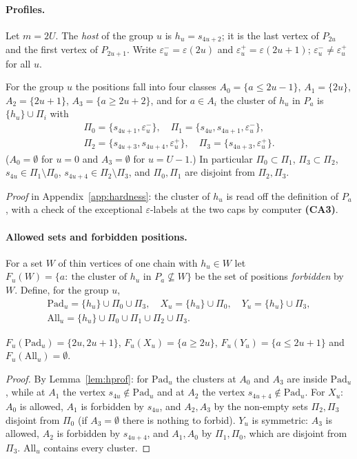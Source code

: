 \paragraph{Profiles.} Let $m=2U$. The \emph{host} of the group $u$ is $h_u=s_{4u+2}$; it is the last vertex of $P_{2u}$ and the first vertex of $P_{2u+1}$. Write $\varepsilon^-_u=\varepsilon(2u)$ and $\varepsilon^+_u=\varepsilon(2u+1)$; $\varepsilon^-_u\ne\varepsilon^+_u$ for all $u$.
\begin{lemma}\label{lem:hprof}
For the group $u$ the positions fall into four classes $A_0=\{a\le2u-1\}$, $A_1=\{2u\}$, $A_2=\{2u+1\}$, $A_3=\{a\ge 2u+2\}$, and for $a\in A_i$ the cluster of $h_u$ in $P_a$ is $\{h_u\}\cup\Pi_i$ with
\[
\begin{gathered}\Pi_0=\{s_{4u+1},\varepsilon^-_u\},\quad \Pi_1=\{s_{4u},s_{4u+1},\varepsilon^-_u\},\\ \Pi_2=\{s_{4u+3},s_{4u+4},\varepsilon^+_u\},\quad \Pi_3=\{s_{4u+3},\varepsilon^+_u\}.\end{gathered}
\]
($A_0=\emptyset$ for $u=0$ and $A_3=\emptyset$ for $u=U-1$.) In particular $\Pi_0\subset\Pi_1$, $\Pi_3\subset\Pi_2$, $s_{4u}\in\Pi_1\setminus\Pi_0$, $s_{4u+4}\in\Pi_2\setminus\Pi_3$, and $\Pi_0,\Pi_1$ are disjoint from $\Pi_2,\Pi_3$.
\end{lemma}
\emph{Proof} in Appendix~\ref{app:hardness}: the cluster of $h_u$ is read off the definition of $P_a$, with a check of the exceptional $\varepsilon$-labels at the two caps by computer \textbf{(CA3)}.

\paragraph{Allowed sets and forbidden positions.} For a set $W$ of thin vertices of one chain with $h_u\in W$ let $F_u(W)=\{a:\ \text{the cluster of }h_u\text{ in }P_a\not\subseteq W\}$ be the set of positions \emph{forbidden} by $W$. Define, for the group $u$,
\[
\begin{gathered}\mathrm{Pad}_u=\{h_u\}\cup\Pi_0\cup\Pi_3,\quad X_u=\{h_u\}\cup\Pi_0,\quad Y_u=\{h_u\}\cup\Pi_3,\\ \mathrm{All}_u=\{h_u\}\cup\Pi_0\cup\Pi_1\cup\Pi_2\cup\Pi_3 .\end{gathered}
\]
\begin{corollary}\label{cor:hforb}
$F_u(\mathrm{Pad}_u)=\{2u,2u+1\}$, $F_u(X_u)=\{a\ge2u\}$, $F_u(Y_u)=\{a\le2u+1\}$ and $F_u(\mathrm{All}_u)=\emptyset$.
\end{corollary}
\begin{proof}
By Lemma~\ref{lem:hprof}: for $\mathrm{Pad}_u$ the clusters at $A_0$ and $A_3$ are inside $\mathrm{Pad}_u$, while at $A_1$ the vertex $s_{4u}\notin\mathrm{Pad}_u$ and at $A_2$ the vertex $s_{4u+4}\notin\mathrm{Pad}_u$. For $X_u$: $A_0$ is allowed, $A_1$ is forbidden by $s_{4u}$, and $A_2,A_3$ by the non-empty sets $\Pi_2,\Pi_3$ disjoint from $\Pi_0$ (if $A_3=\emptyset$ there is nothing to forbid). $Y_u$ is symmetric: $A_3$ is allowed, $A_2$ is forbidden by $s_{4u+4}$, and $A_1,A_0$ by $\Pi_1,\Pi_0$, which are disjoint from $\Pi_3$. $\mathrm{All}_u$ contains every cluster.
\end{proof}

